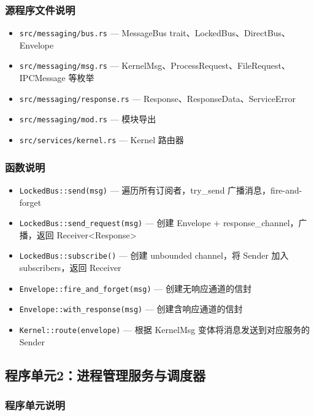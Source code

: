 \documentclass[UTF8,a4paper,12pt]{ctexart}
\begin{document}
\subsubsection{源程序文件说明}

\begin{itemize}
    \item \texttt{src/messaging/bus.rs} — MessageBus trait、LockedBus、DirectBus、Envelope
    \item \texttt{src/messaging/msg.rs} — KernelMsg、ProcessRequest、FileRequest、IPCMessage 等枚举
    \item \texttt{src/messaging/response.rs} — Response、ResponseData、ServiceError
    \item \texttt{src/messaging/mod.rs} — 模块导出
    \item \texttt{src/services/kernel.rs} — Kernel 路由器
\end{itemize}

\subsubsection{函数说明}

\begin{itemize}
    \item \texttt{LockedBus::send(msg)} — 遍历所有订阅者，try\_send 广播消息，fire-and-forget
    \item \texttt{LockedBus::send\_request(msg)} — 创建 Envelope + response\_channel，广播，返回 Receiver<Response>
    \item \texttt{LockedBus::subscribe()} — 创建 unbounded channel，将 Sender 加入 subscribers，返回 Receiver
    \item \texttt{Envelope::fire\_and\_forget(msg)} — 创建无响应通道的信封
    \item \texttt{Envelope::with\_response(msg)} — 创建含响应通道的信封
    \item \texttt{Kernel::route(envelope)} — 根据 KernelMsg 变体将消息发送到对应服务的 Sender
\end{itemize}

\subsection{程序单元2：进程管理服务与调度器}

\subsubsection{程序单元说明}
\end{document}
